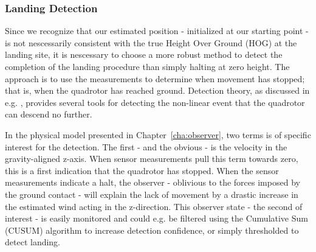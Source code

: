             \subsubsection{Landing Detection}
            \label{ssec:logic:landing:detection}
                Since we recognize that our estimated position - initialized at our starting point -
                is not nescessarily consistent with the true Height Over Ground (HOG)
                at the landing site, it is nescessary to choose a more robust
                method to detect the completion of the landing procedure than simply halting at zero height.
                The approach is to use the measurements to determine when movement
                has stopped; that is, when the quadrotor has reached ground.
                Detection theory, as discussed in e.g. \citep{Tornqvist08,nyberg11diagnosis},
                provides several tools for detecting the non-linear event that
                the quadrotor can descend no further.

                In the physical model presented in Chapter~\ref{cha:observer},
                two terms is of specific interest for the detection.
                The first - and the obvious - is the velocity in the gravity-aligned z-axis.
                When sensor measurements pull this term towards zero,
                this is a first indication that the quadrotor has stopped.
                When the sensor measurements indicate a halt, the
                observer - oblivious to the forces imposed by the
                ground contact - will explain the lack of movement by a drastic increase in
                the estimated wind acting in the z-direction.
                This observer state - the second of interest - is easily monitored
                and could e.g. be filtered using the Cumulative Sum (CUSUM) algorithm to
                increase detection confidence, or simply thresholded to detect landing.
